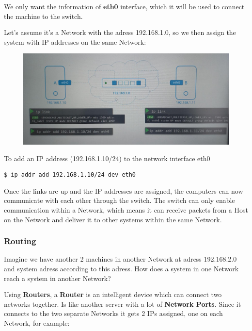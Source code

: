 \documentclass{article}
\newenvironment{codetemplate}[1][]{%
  \mybasecolorbox[#1]
  \itshape
}{%
  \endmybasecolorbox
}
\begin{document}
We only want the information of \textbf{eth0} interface, which it will be used to connect the machine to the switch. 

Let's assume it's a Network with the adress 192.168.1.0, so we then assign the system with IP addresses on the same Network:

\begin{figure}[H]
    \includegraphics[width=\textwidth]{pictures/ntw2.png}
\end{figure}

To add an IP address (192.168.1.10/24) to the network interface eth0
\begin{codetemplate}{}
\begin{verbatim}
$ ip addr add 192.168.1.10/24 dev eth0
\end{verbatim}
\end{codetemplate}

Once the links are up and the IP addresses are assigned, the computers can now communicate with each other through the switch. The switch can only enable communication within a Network, which means it can receive packets from a Host on the Network and deliver it to other systems within the same Network.

\subsubsection{Routing}

Imagine we have another 2 machines in another Network at adress 192.168.2.0 and system adress according to this adress. How does a system in one Network reach a system in another Network?

Using \textbf{Routers}, a \textbf{Router} is an intelligent device which can connect two networks together. Is like another server with a lot of \textbf{Network Ports}. Since it connects to the two separate Networks it gets 2 IPs assigned, one on each Network, for example:
\end{document}
